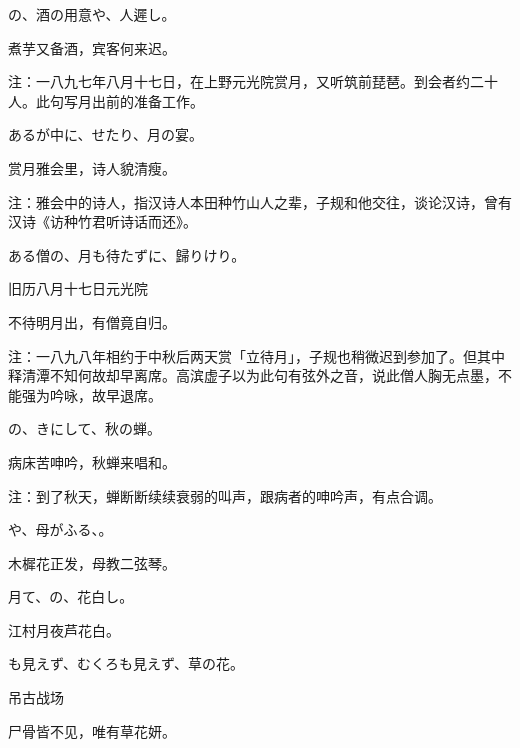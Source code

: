\begin{haiku}
    {\FH {}の、酒の用意や、人遲し。}

    {\FK 煮芋又备酒，宾客何来迟。}

    {\FT 注：一八九七年八月十七日，在上野元光院赏月，又听筑前琵琶。到会者约二十人。此句写月出前的准备工作。}
\end{haiku}

\begin{haiku}
    {\FH あるが中に、せたり、月の宴。}

    {\FK 赏月雅会里，诗人貌清瘦。}

    {\FT 注：雅会中的诗人，指汉诗人本田种竹山人之辈，子规和他交往，谈论汉诗，曾有汉诗《访种竹君听诗话而还》。}
\end{haiku}

\begin{haiku}
    {\FH ある僧の、月も待たずに、歸りけり。}

    {\FK 旧历八月十七日元光院}

    {\FK 不待明月出，有僧竟自归。}

    {\FT 注：一八九八年相约于中秋后两天赏「立待月」，子规也稍微迟到参加了。但其中释清潭不知何故却早离席。高滨虚子以为此句有弦外之音，说此僧人胸无点墨，不能强为吟咏，故早退席。}
\end{haiku}

\begin{haiku}
    {\FH {}の、きにして、秋の蝉。}

    {\FK 病床苦呻吟，秋蝉来唱和。}

    {\FT 注：到了秋天，蝉断断续续衰弱的叫声，跟病者的呻吟声，有点合调。}
\end{haiku}

\begin{haiku}
    {\FH {}や、母がふる、。}

    {\FK 木樨花正发，母教二弦琴。}
\end{haiku}

\begin{haiku}
    {\FH 月て、の、花白し。}

    {\FK 江村月夜芦花白。}
\end{haiku}

\begin{haiku}
    {\FH {}も見えず、むくろも見えず、草の花。}

    {\FK 吊古战场}

    {\FK 尸骨皆不见，唯有草花妍。}
\end{haiku}

